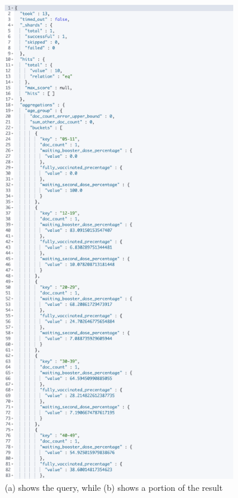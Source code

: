 \documentclass{article}[IEEEtran]
\begin{document}
\begin{figure}[H]
\begin{center}
\begin{minipage}[b]{0.4\textwidth}
    \subcaption{}
  \end{minipage}
  \hfill
  \begin{minipage}[b]{0.4\textwidth}
    \includegraphics[width=0.9\textwidth, frame]{Answer_Query_9BIS.png}
     \subcaption{}
  \end{minipage}
  \caption{(a) shows the query, while (b) shows a portion of the result}
\end{center}
\end{figure}
\end{document}
